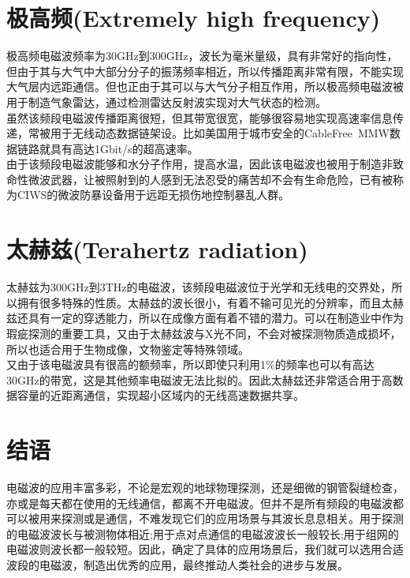 \documentclass[UTF8]{article}
\begin{document}
\begin{CJK}{UTF8}{gkai}
\section{极高频(Extremely high frequency)}
极高频电磁波频率为30GHz到300GHz，波长为毫米量级，具有非常好的指向性，但由于其与大气中大部分分子的振荡频率相近，所以传播距离非常有限，不能实现大气层内远距通信。但也正由于其可以与大气分子相互作用，所以极高频电磁波被用于制造气象雷达，通过检测雷达反射波实现对大气状态的检测。\\
虽然该频段电磁波传播距离很短，但其带宽很宽，能够很容易地实现高速率信息传递，常被用于无线动态数据链架设。比如美国用于城市安全的CableFree\ MMW数据链路就具有高达1Gbit/s的超高速率。\\
由于该频段电磁波能够和水分子作用，提高水温，因此该电磁波也被用于制造非致命性微波武器，让被照射到的人感到无法忍受的痛苦却不会有生命危险，已有被称为CIWS的微波防暴设备用于远距无损伤地控制暴乱人群。
\section{太赫兹(Terahertz radiation)}
太赫兹为300GHz到3THz的电磁波，该频段电磁波位于光学和无线电的交界处，所以拥有很多特殊的性质。太赫兹的波长很小，有着不输可见光的分辨率，而且太赫兹还具有一定的穿透能力，所以在成像方面有着不错的潜力。可以在制造业中作为瑕疵探测的重要工具，又由于太赫兹波与X光不同，不会对被探测物质造成损坏，所以也适合用于生物成像，文物鉴定等特殊领域。\\
又由于该电磁波具有很高的额频率，所以即使只利用1\%的频率也可以有高达30GHz的带宽，这是其他频率电磁波无法比拟的。因此太赫兹还非常适合用于高数据容量的近距离通信，实现超小区域内的无线高速数据共享。
\section*{结语}
电磁波的应用丰富多彩，不论是宏观的地球物理探测，还是细微的钢管裂缝检查，亦或是每天都在使用的无线通信，都离不开电磁波。但并不是所有频段的电磁波都可以被用来探测或是通信，不难发现它们的应用场景与其波长息息相关。用于探测的电磁波波长与被测物体相近;用于点对点通信的电磁波波长一般较长;用于组网的电磁波则波长都一般较短。因此，确定了具体的应用场景后，我们就可以选用合适波段的电磁波，制造出优秀的应用，最终推动人类社会的进步与发展。
\end{CJK}


\end{document}
